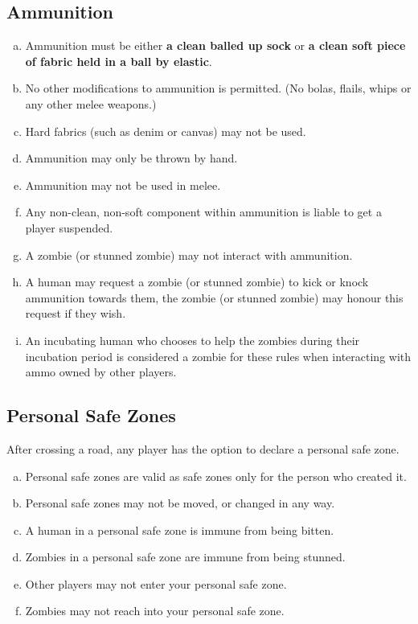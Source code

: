 \documentclass[a4paper,12pt]{article}
\begin{document}
\subsection{Ammunition}
\begin{enumerate}[(a)]
    \item Ammunition must be either {\bf a clean balled up sock} or {\bf a clean soft piece of fabric held in a ball by elastic}.
    \item No other modifications to ammunition is permitted. (No bolas, flails, whips or any other melee weapons.)
    \item Hard fabrics (such as denim or canvas) may not be used.
    \item Ammunition may only be thrown by hand.
    \item Ammunition may not be used in melee.
    \item Any non-clean, non-soft component within ammunition is liable to get a player suspended.
    \item A zombie (or stunned zombie) may not interact with ammunition. 
    \item A human may request a zombie (or stunned zombie) to kick or knock ammunition towards them, the zombie (or stunned zombie) may honour this request if they wish.
    \item An incubating human who chooses to help the zombies during their incubation period is considered a zombie for these rules when interacting with ammo owned by other players. 
\end{enumerate}

\subsection{Personal Safe Zones}
\label{PersonalSafeZoneRules}
After crossing a road, any player has the option to declare a personal safe zone.
\begin{enumerate}[(a)]
    \item Personal safe zones are valid as safe zones only for the person who created it.
    \item Personal safe zones may not be moved, or changed in any way.
    \item A human in a personal safe zone is immune from being bitten.
    \item Zombies in a personal safe zone are immune from being stunned.
    \item Other players may not enter your personal safe zone.
    \item Zombies may not reach into your personal safe zone.
\end{enumerate} 
\end{document}
